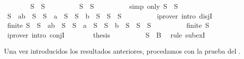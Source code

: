 \begin{isabellebody}
\ \ \ \ \ \ \isamarkupfalse%
\ {\isachardoublequoteopen}S\ {\isacharequal}\ S{}{\isachardoublequoteclose}\isanewline
\ \ \ \ \ \ \isamarkupfalse%
\ \isamarkupfalse%
\ {\isachardoublequoteopen}S\ {\isacharequal}\ S{}{\isachardoublequoteclose}\isanewline
\ \ \ \ \ \ \ \ \isamarkupfalse%
\ {\isacharparenleft}simp\ only{\isacharcolon}\ {\isacartoucheopen}S{}\ {\isacharequal}\ S{}{\isacartoucheclose}{\isacharparenright}\isanewline
\ \ \ \ \ \ \isamarkupfalse%
\ \isamarkupfalse%
\ {\isachardoublequoteopen}S\ {\isacharequal}\ {\isacharbraceleft}a{\isacharcomma}b{\isacharbraceright}\ {\isasymunion}\ S{}\ {\isasymor}\ S\ {\isacharequal}\ {\isacharbraceleft}a{\isacharbraceright}\ {\isasymunion}\ S{}\ {\isasymor}\ S\ {\isacharequal}\ {\isacharbraceleft}b{\isacharbraceright}\ {\isasymunion}\ S{}\ {\isasymor}\ S\ {\isacharequal}\ S{}{\isachardoublequoteclose}\isanewline
\ \ \ \ \ \ \ \ \isamarkupfalse%
\ {\isacharparenleft}iprover\ intro{\isacharcolon}\ disjI{}{\isacharparenright}\isanewline
\ \ \ \ \ \ \isamarkupfalse%
\ \isamarkupfalse%
\ {\isachardoublequoteopen}finite\ S{}\ {\isasymand}\ {\isacharparenleft}S\ {\isacharequal}\ {\isacharbraceleft}a{\isacharcomma}b{\isacharbraceright}\ {\isasymunion}\ S{}\ {\isasymor}\ S\ {\isacharequal}\ {\isacharbraceleft}a{\isacharbraceright}\ {\isasymunion}\ S{}\ {\isasymor}\ S\ {\isacharequal}\ {\isacharbraceleft}b{\isacharbraceright}\ {\isasymunion}\ S{}\ {\isasymor}\ S\ {\isacharequal}\ S{}{\isacharparenright}{\isachardoublequoteclose}\isanewline
\ \ \ \ \ \ \ \ \isamarkupfalse%
\ {\isacartoucheopen}finite\ S{}{\isacartoucheclose}\ \isamarkupfalse%
\ {\isacharparenleft}iprover\ intro{\isacharcolon}\ conjI{\isacharparenright}\isanewline
\ \ \ \ \ \ \isamarkupfalse%
\ {\isacharquery}thesis\isanewline
\ \ \ \ \ \ \ \ \isamarkupfalse%
\ {\isacartoucheopen}S{}\ {\isasymsubseteq}\ B{\isacartoucheclose}\ \isamarkupfalse%
\ {\isacharparenleft}rule\ subexI{\isacharparenright}\isanewline
\ \ \ \ \isamarkupfalse%
\isanewline
\ \ \isamarkupfalse%
\isanewline
{}\isamarkupfalse%
%
\endisatagproof
{\isafoldproof}%
%
\isadelimproof
%
\endisadelimproof
%
\begin{isamarkuptext}%
Una vez introducidos los resultados anteriores, procedamos con la prueba del .


\end{isamarkuptext}
\end{isabellebody}
